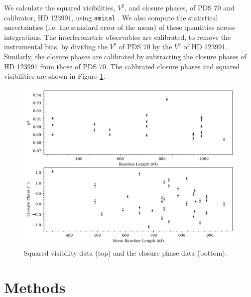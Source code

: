 \documentclass[11pt,twocolumn,twocolappendix]{aastex631}
\begin{document}
We calculate the squared visibilities, $V^2$, and closure phases, of PDS 70 and calibrator, HD 123991, using \texttt{amical} \citep{2020SPIE11446E..11S,2023ascl.soft02021S}. We also compute the statistical uncertainties (i.e. the standard error of the mean) of these quantities across integrations. The interferometric observables are calibrated, to remove the instrumental bias, by dividing the $V^2$ of PDS 70 by the $V^2$ of HD 123991. Similarly, the closure phases are calibrated by subtracting the closure phases of HD 123991 from those of PDS 70. The calibrated closure phases and squared visibilities are shown in Figure \ref{fig:f480M_cps}.



\begin{figure}
\centering
\includegraphics[width=0.85\linewidth]{observables_rev.png}
\caption{Squared visibility data (top) and the closure phase data (bottom).}
\label{fig:f480M_cps}
\end{figure}



\section{Methods} 
\label{sec:met}
\end{document}
